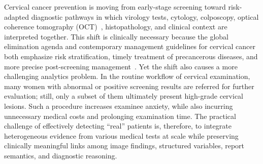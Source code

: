 \documentclass[11pt, a4paper]{article}
\theoremstyle{plain}
\theoremstyle{definition}
\begin{document}


Cervical cancer prevention is moving from early-stage screening toward risk-adapted diagnostic pathways in which virology tests, cytology, colposcopy, optical coherence tomography (OCT)~\cite{huang1991oct}, histopathology, and clinical context are interpreted together. This shift is clinically necessary because the global elimination agenda and contemporary management guidelines for cervical cancer both emphasize risk stratification, timely treatment of precancerous diseases, and more precise post-screening management~\cite{who2020global_strategy,canfell2020mortality,perkins2020asccp}. Yet the shift also causes a more challenging analytics problem. In the routine workflow of cervical examination, many women with abnormal or positive screening results are referred for further evaluation; still, only a subset of them ultimately present high-grade cervical lesions. Such a procedure increases examinee anxiety, while also incurring unnecessary medical costs and prolonging examination time. The practical challenge of effectively detecting ``real'' patients is, therefore, to integrate heterogeneous evidence from various medical tests at scale while preserving clinically meaningful links among image findings, structured variables, report semantics, and diagnostic reasoning.
\end{document}
